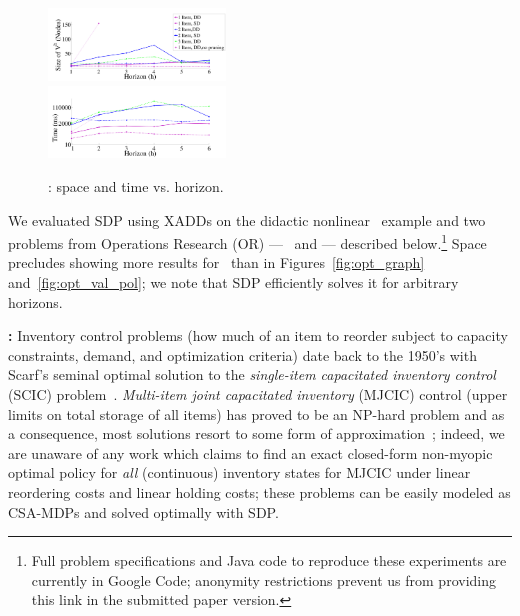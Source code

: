 \begin{figure}[tbp!]
\vspace{-2mm}
\centering
\includegraphics[width=0.42\textwidth]{new_pics/space1.pdf}\\
\vspace{-2mm}
\includegraphics[width=0.42\textwidth]{new_pics/time1.pdf}
\vspace{-2mm}
\caption{\footnotesize \InventoryControl: space 
and time vs. horizon.
}
\label{fig:invC}
\vspace{-4mm}
\end{figure}

\label{sec:results}
 
We evaluated SDP using XADDs on the didactic nonlinear
\MarsRover\ example and two problems from Operations Research (OR) --- 
\InventoryControl\ and \WaterReservoir --- described below.\footnote{
Full problem specifications and Java code to
reproduce these experiments are currently 
in Google Code; anonymity restrictions 
prevent us from providing this link in the submitted paper version.}
Space precludes showing 
more results for \MarsRover\ than in Figures~\ref{fig:opt_graph}
and~\ref{fig:opt_val_pol}; we note that SDP efficiently solves it
for arbitrary horizons.

{\bf \InventoryControl:} Inventory control problems (how much of an
item to reorder subject to capacity constraints, demand, and 
optimization criteria) date back to the 1950's with
Scarf's seminal optimal solution to the \emph{single-item capacitated
inventory control} (SCIC) problem~\cite{Scarf_Karlin58}.
\emph{Multi-item joint capacitated inventory} (MJCIC) control (upper limits
on total storage of all items) has proved to be an NP-hard problem and
as a consequence, most solutions resort to some form of
approximation~\cite{bitran,wusd10}; indeed, we are unaware of any 
work which claims to find an exact closed-form non-myopic
optimal policy for \emph{all} (continuous) inventory states for MJCIC 
under linear reordering costs and linear holding costs; these 
problems can be easily modeled as CSA-MDPs and solved optimally
with SDP.  

